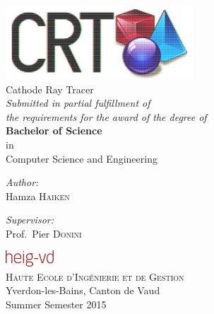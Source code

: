 \documentclass[a4paper, twocolumn, 10pt, twoside]{report}
\begin{document}
\begin{titlepage}
\begin{center}

~\\[5cm]
\includegraphics[width=7cm]{../res/logo/logo.png}~\\[0.5cm]

{\sc \huge Cathode Ray Tracer } \\[2cm]
{\large \em Submitted in partial fulfillment of\\the requirements for the award of the degree of}\\[0.5cm]
{ \large {\bfseries Bachelor of Science} \\in\\Computer Science and Engineering }\\[2cm]

\noindent

\begin{minipage}{0.25\textwidth}
  \begin{flushleft} \large
    \emph{Author:}\\
    Hamza \textsc{Haiken}
  \end{flushleft}
\end{minipage}%
\begin{minipage}{0.25\textwidth}
  \begin{flushright} \large
    \emph{Supervisor:}\\
    Prof.~Pier \textsc{Donini}
  \end{flushright}
\end{minipage}

\vfill


\includegraphics[height=0.6cm]{img/heig-vd.png}\\[0.4cm]
\textsc{\Large Haute Ecole d'Ingénierie et de Gestion}\\[0.4cm]
{ \large Yverdon-les-Bains, Canton de Vaud}\\[0.8cm]
{ \Large Summer Semester 2015}

\end{center}
\end{titlepage}
\end{document}
